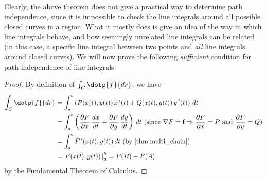 Clearly, the above theorem does not give a practical way to determine path independence, since it is impossible to check the line integrals around all possible closed curves in a region. What it mostly does is give an idea of the way in which line integrals behave, and how seemingly unrelated line integrals can be related (in this case, a specific line integral between two points and \emph{all} line integrals around closed curves).
%
%
%
We will now prove the following \emph{sufficient} condition for path independence of line integrals:


\begin{proof}
 By definition of $\int_{C}\dotp{f}{dr}$, we have
 \begin{align*}
  \int_{C}\dotp{f}{dr}
  &= \int_a^b \left( P(x(t),y(t))\,x\,'(t) + Q(x(t),y(t))\,y\,'(t) \right)\,dt\\
  &= \int_a^b \left( \frac{\partial F}{\partial x}\,\frac{dx}{dt} + \frac{\partial F}{\partial y}\,\frac{dy}{dt}
   \right)\,dt \text{ (since $\nabla F = \textbf{f} \Rightarrow \frac{\partial F}{\partial x} = P$ and
  $\frac{\partial F}{\partial y} = Q$)}\\
  &= \int_a^b F\,'(x(t),y(t))\,dt \text{ (by \autoref{thm:multi_chain})}\\
  &= \left.F(x(t),y(t)) \,\right|_a^b = F(B) - F(A)
 \end{align*}
 by the Fundamental Theorem of Calculus.
\end{proof}

